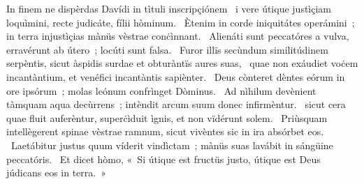 { In finem ne dispèrdas Davídi in tìtuli inscripçiónem}
{%
~i vere útique justìçiam loquìmini, recte judicáte, fílii hòminum. 
~Ètenim in corde iniquitátes operámini~; in terra injustìçias mànüs vèstrae conċìnnant. 
~Alienáti sunt peccatóres a vulva, erravérunt ab útero~; locúti sunt falsa. 
~Furor illïs secùndum similitúdinem serpèntis, sicut àspidis surdae et obturàntïs aures suas, 
~quae non exáudiet voċem incantàntium, et venéfici incantàntis sapiènter. 
~Deus cònteret dèntes eórum in ore ipsórum~; molas leónum confrìnget Dòminus. 
~Ad nìhilum devènient tàmquam aqua decùrrens~; intèndit arcum suum donec infirmèntur. 
~sicut cera quae fluit auferèntur, superċìduit ìgnis, et non vïdérunt solem. 
~Priùsquam intellègerent spinae vèstrae ramnum, sicut vivèntes sic in ira absórbet eos. 
~Laetábitur justus quum víderit vindìctam~; mànüs suas lavábit in sángüine peccatóris. 
~Et dicet hòmo, «~Si útique est fructüs justo, útique est Deus júdicans eos in terra.~»
}
